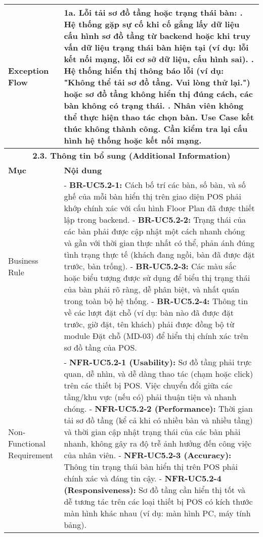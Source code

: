 \begin{longtable}{|m{4cm}|p{11cm}|}
\hline
Exception Flow & \textbf{1a. Lỗi tải sơ đồ tầng hoặc trạng thái bàn:} \newline    1. Hệ thống gặp sự cố khi cố gắng lấy dữ liệu cấu hình sơ đồ tầng từ backend hoặc khi truy vấn dữ liệu trạng thái bàn hiện tại (ví dụ: lỗi kết nối mạng, lỗi cơ sở dữ liệu, cấu hình sai). \newline    2. Hệ thống hiển thị thông báo lỗi (ví dụ: "Không thể tải sơ đồ tầng. Vui lòng thử lại.") hoặc sơ đồ tầng không hiển thị đúng cách, các bàn không có trạng thái. \newline    3. Nhân viên không thể thực hiện thao tác chọn bàn. Use Case kết thúc không thành công. Cần kiểm tra lại cấu hình hệ thống hoặc kết nối mạng. \\
\hline
\multicolumn{2}{|c|}{\textbf{2.3. Thông tin bổ sung (Additional Information)}} \\
\hline
\textbf{Mục} & \textbf{Nội dung} \\
\hline
Business Rule & - \textbf{BR-UC5.2-1:} Cách bố trí các bàn, số bàn, và số ghế của mỗi bàn hiển thị trên giao diện POS phải khớp chính xác với cấu hình Floor Plan đã được thiết lập trong backend. \newline - \textbf{BR-UC5.2-2:} Trạng thái của các bàn phải được cập nhật một cách nhanh chóng và gần với thời gian thực nhất có thể, phản ánh đúng tình trạng thực tế (khách đang ngồi, bàn đã được đặt trước, bàn trống). \newline - \textbf{BR-UC5.2-3:} Các màu sắc hoặc biểu tượng được sử dụng để biểu thị trạng thái của bàn phải rõ ràng, dễ phân biệt, và nhất quán trong toàn bộ hệ thống. \newline - \textbf{BR-UC5.2-4:} Thông tin về các lượt đặt chỗ (ví dụ: bàn nào đã được đặt trước, giờ đặt, tên khách) phải được đồng bộ từ module Đặt chỗ (MD-03) để hiển thị chính xác trên sơ đồ tầng của POS. \\
\hline
Non-Functional Requirement & - \textbf{NFR-UC5.2-1 (Usability):} Sơ đồ tầng phải trực quan, dễ nhìn, và dễ dàng thao tác (chạm hoặc click) trên các thiết bị POS. Việc chuyển đổi giữa các tầng/khu vực (nếu có) phải thuận tiện và nhanh chóng. \newline - \textbf{NFR-UC5.2-2 (Performance):} Thời gian tải sơ đồ tầng (kể cả khi có nhiều bàn và nhiều tầng) và thời gian cập nhật trạng thái của các bàn phải nhanh, không gây ra độ trễ ảnh hưởng đến công việc của nhân viên. \newline - \textbf{NFR-UC5.2-3 (Accuracy):} Thông tin trạng thái bàn hiển thị trên POS phải chính xác và đáng tin cậy. \newline - \textbf{NFR-UC5.2-4 (Responsiveness):} Sơ đồ tầng cần hiển thị tốt và dễ tương tác trên các loại thiết bị POS có kích thước màn hình khác nhau (ví dụ: màn hình PC, máy tính bảng). \\
\hline
\end{longtable}

